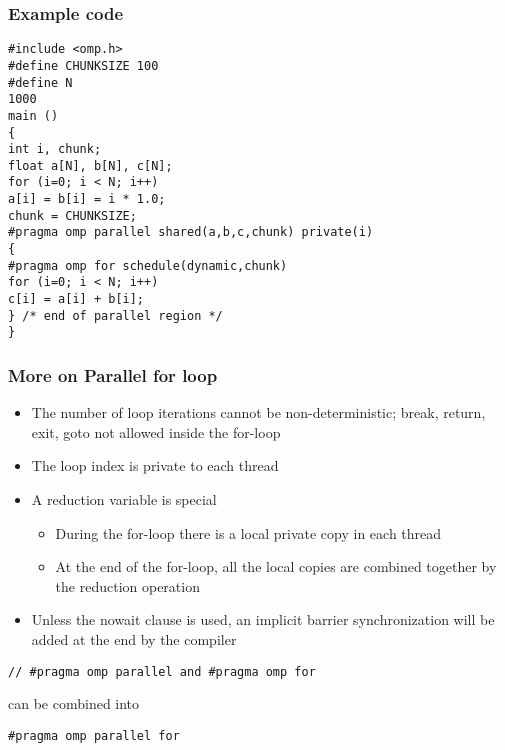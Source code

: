 \documentclass{beamer}
\begin{document}
\begin{frame}
\frametitle{Example code}

\begin{block}{}
\begin{verbatim}
#include <omp.h>
#define CHUNKSIZE 100
#define N
1000
main ()
{
int i, chunk;
float a[N], b[N], c[N];
for (i=0; i < N; i++)
a[i] = b[i] = i * 1.0;
chunk = CHUNKSIZE;
#pragma omp parallel shared(a,b,c,chunk) private(i)
{
#pragma omp for schedule(dynamic,chunk)
for (i=0; i < N; i++)
c[i] = a[i] + b[i];
} /* end of parallel region */
}
\end{verbatim}


\end{block}
\end{frame}

\begin{frame}
\frametitle{More on Parallel for loop}

\begin{block}{}
\begin{itemize}
\item The number of loop iterations cannot be non-deterministic; break, return, exit, goto not allowed inside the for-loop

\item The loop index is private to each thread

\item A reduction variable is special
\begin{itemize}

  \item During the for-loop there is a local private copy in each thread

  \item At the end of the for-loop, all the local copies are combined together by the reduction operation

\end{itemize}

\noindent
\item Unless the nowait clause is used, an implicit barrier synchronization will be added at the end by the compiler
\end{itemize}

\noindent
\begin{verbatim}
// #pragma omp parallel and #pragma omp for
\end{verbatim}
can be combined into
\begin{verbatim}
#pragma omp parallel for
\end{verbatim}


\end{block}
\end{frame}
\end{document}
